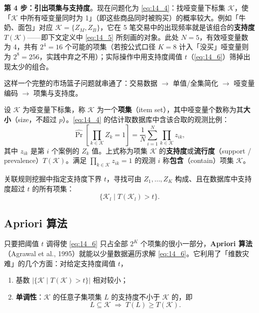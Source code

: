\begin{example}[市场篮子问题的完整流程演示]
\textbf{第 4 步：引出项集与支持度}。现在问题化为 \eqref{eq:14_4}：找哑变量下标集 $\mathcal{K}$，使「$\mathcal{K}$ 中所有哑变量同时为 1」（即这些商品同时被购买）的概率较大。例如「牛奶、面包」对应 $\mathcal{K}=\{Z_M,Z_B\}$，它在 5 笔交易中的出现频率就是该组合的\textbf{支持度} $T(\mathcal{K})$——即下文定义中 \eqref{eq:14_5} 所刻画的对象。此处 $N=5$，有效哑变量数为 4，共有 $2^4=16$ 个可能的项集（若按公式口径 $K=8$ 计入「没买」哑变量则为 $2^8=256$，实践中弃之不用）；实际操作中用支持度阈值 $t$（\eqref{eq:14_6}）筛掉出现太少的组合。

这样一个完整的市场篮子问题就串通了：交易数据 $\to$ 单值/全集简化 $\to$ 哑变量编码 $\to$ 项集与支持度。
\end{example}

\begin{definition}[项集、支持度]
设 $\mathcal{K}$ 为哑变量下标集，称 $\mathcal{K}$ 为一个\textbf{项集}（item set），其中哑变量个数称为其\textbf{大小}（size，不超过 $p$）。\eqref{eq:14_4} 的估计取数据库中含该合取的观测比例：
\begin{equation}
\hat\Pr\left[\prod_{k\in\mathcal{K}} Z_k=1\right] = \frac{1}{N}\sum_{i=1}^{N}\prod_{k\in\mathcal{K}} z_{ik}, \label{eq:14_5}
\end{equation}
其中 $z_{ik}$ 是第 $i$ 个案例的 $Z_k$ 值。上式称为项集 $\mathcal{K}$ 的\textbf{支持度}或\textbf{流行度}（support / prevalence）$T(\mathcal{K})$。满足 $\prod_{k\in\mathcal{K}} z_{ik}=1$ 的观测 $i$ 称\textbf{包含}（contain）项集 $\mathcal{K}$。

关联规则挖掘中指定支持度下界 $t$，寻找可由 $Z_1,\dots,Z_K$ 构成、且在数据库中支持度超过 $t$ 的所有项集：
\begin{equation}
\{\mathcal{K}_l \mid T(\mathcal{K}_l) > t\}. \label{eq:14_6}
\end{equation}
\end{definition}

\subsection{Apriori 算法}

只要把阈值 $t$ 调得使 \eqref{eq:14_6} 只占全部 $2^K$ 个项集的很小一部分，\textbf{Apriori 算法}（Agrawal et al., 1995）就能以少量数据遍历求解 \eqref{eq:14_6}。它利用了「维数灾难」的几个方面：对给定支持度阈值 $t$，
\begin{enumerate}[itemsep=1pt]
\item 基数 $|\{\mathcal{K}\mid T(\mathcal{K})>t\}|$ 相对较小；
\item \textbf{单调性}：$\mathcal{K}$ 的任意子集项集 $L$ 的支持度不小于 $\mathcal{K}$ 的，即
\[
L\subseteq \mathcal{K} \;\Longrightarrow\; T(L)\ge T(\mathcal{K}).
\]
\end{enumerate}

